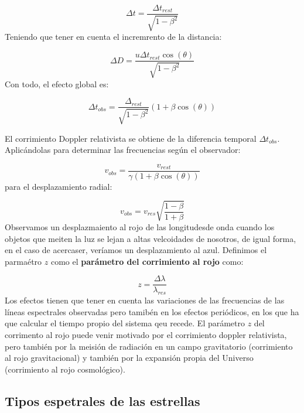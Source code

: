 \begin{equation}
	\Delta t = \frac{\Delta t_{rest}}{\sqrt{1-\beta^2}}
\end{equation}
Teniendo que tener en cuenta el incremrento de la distancia:

\begin{equation}
	\Delta D = \frac{u\Delta t_{rest}\cos(\theta)}{\sqrt{1-\beta^2}}
\end{equation}
Con todo, el efecto global es:

\begin{equation}
	\Delta t_{obs} = \frac{\Delta_{rest}}{\sqrt{1-\beta^2}}(1+\beta \cos (\theta))
\end{equation}

El corrimiento Doppler relativista se obtiene de la diferencia temporal $\Delta t_{obs}$. Aplicándolas para determinar las frecuencias según el observador:

\begin{equation}
	v_{obs} = \frac{v_{rest}}{\gamma(1+\beta \cos (\theta))}
\end{equation}
para el desplazamiento radial:

\begin{equation}
	v_{obs} = v_{res} \sqrt{\frac{1-\beta}{1+\beta}}
\end{equation}
Observamos un desplazmaiento al rojo de las longitudesde onda cuando los objetos que meiten la luz se lejan a altas velcoidades de nosotros, de igual forma, en el caso de acercaser, veríamos un desplazamiento al azul. Definimos el parmaétro $z$ como el \textbf{parámetro del corrimiento al rojo} como:

\begin{equation}
	z = \frac{\Delta \lambda}{\lambda_{res}}
\end{equation}
Los efectos tienen que tener en cuenta las variaciones de las frecuencias de las líneas espectrales observadas pero tamibén en los efectos periódicos, en los que ha que calcular el tiempo propio del sistema qeu recede. El parámetro $z$ del corrimento al rojo puede venir motivado por el corrimiento doppler relativista, pero también por la meisión de radiación en un campo gravitatorio (corrimiento al rojo gravitacional) y también por la expansión propia del Universo (corrimiento al rojo cosmológico).

\subsection{Tipos espetrales de las estrellas}

